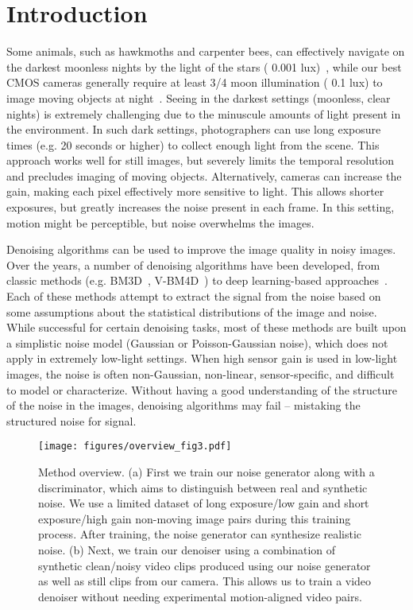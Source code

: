 \documentclass[final]{cvpr}
\begin{document}
\section{Introduction}
Some animals, such as hawkmoths and carpenter bees, can effectively navigate on the darkest moonless nights by the light of the stars ( 0.001 lux)~\cite{somanathan2008visual, warrant2004vision, kelber2002scotopic}, while our best CMOS cameras generally require at least 3/4 moon illumination ( 0.1 lux) to image moving objects at night~\cite{nightonearth}. Seeing in the darkest settings (moonless, clear nights) is extremely challenging due to the minuscule amounts of light present in the environment. In such dark settings, photographers can use long exposure times (e.g. 20 seconds or higher) to collect enough light from the scene. This approach works well for still images, but severely limits the temporal resolution and precludes imaging of moving objects. Alternatively, cameras can increase the gain, making each pixel effectively more sensitive to light. This allows shorter exposures, but greatly increases the noise present in each frame. In this setting, motion might be perceptible, but noise overwhelms the images.

Denoising algorithms can be used to improve the image quality in noisy images. Over the years, a number of denoising algorithms have been developed, from classic methods (e.g. BM3D~\cite{dabov2007image}, V-BM4D~\cite{maggioni2012video}) to deep learning-based approaches~\cite{zhang2017beyond}. Each of these methods attempt to extract the signal from the noise based on some assumptions about the statistical distributions of the image and noise. While successful for certain denoising tasks, most of these methods are built upon a simplistic noise model (Gaussian or Poisson-Gaussian noise), which does not apply in extremely low-light settings. When high sensor gain is used in low-light images, the noise is often non-Gaussian, non-linear, sensor-specific, and difficult to model or characterize. Without having a good understanding of the structure of the noise in the images, denoising algorithms may fail -- mistaking the structured noise for signal. 

\begin{figure*}[!t]
\centering
\texttt{[image: figures/overview\_fig3.pdf]}
   \caption{Method overview. (a) First we train our noise generator along with a discriminator, which aims to distinguish between real and synthetic noise. We use a limited dataset of long exposure/low gain and short exposure/high gain non-moving image pairs during this training process. After training, the noise generator can synthesize realistic noise. (b) Next, we train our denoiser using a combination of synthetic clean/noisy video clips produced using our noise generator as well as still clips from our camera. This allows us to train a video denoiser without needing experimental motion-aligned video pairs.}
\label{fig:overview}
\vspace{-4mm}
\end{figure*}
\end{document}
